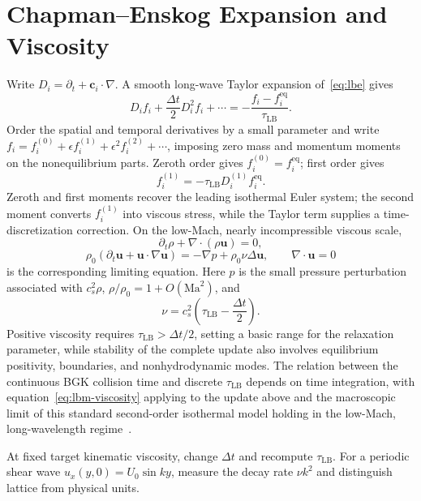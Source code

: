 \section{Chapman--Enskog Expansion and Viscosity}
Write $D_i=\partial_t+\bm c_i\cdot\nabla$.
A smooth long-wave Taylor expansion of~\eqref{eq:lbe} gives
\[
D_if_i+\frac{\Delta t}{2}D_i^2f_i+\cdots
=-\frac{f_i-f_i^{\mathrm{eq}}}{\tau_{\mathrm{LB}}}.
\]
Order the spatial and temporal derivatives by a small parameter and write
$f_i=f_i^{(0)}+\epsilon f_i^{(1)}+\epsilon^2f_i^{(2)}+\cdots$,
imposing zero mass and momentum moments on the nonequilibrium parts.
Zeroth order gives $f_i^{(0)}=f_i^{\mathrm{eq}}$; first order gives
\[
f_i^{(1)}=-\tau_{\mathrm{LB}}D_i^{(1)}f_i^{\mathrm{eq}}.
\]
Zeroth and first moments recover the leading isothermal Euler system;
the second moment converts $f_i^{(1)}$ into viscous stress, while the Taylor term supplies a time-discretization correction.
On the low-Mach, nearly incompressible viscous scale,
\[
\partial_t\rho+\nabla\cdot(\rho\bm u)=0,
\]
\[
\rho_0(\partial_t\bm u+\bm u\cdot\nabla\bm u)
=-\nabla p+\rho_0\nu\Delta\bm u,\qquad
\nabla\cdot\bm u=0
\]
is the corresponding limiting equation. Here $p$ is the small pressure perturbation associated with $c_s^2\rho$,
$\rho/\rho_0=1+O(\mathrm{Ma}^2)$, and
\begin{equation}\label{eq:lbm-viscosity}
\nu=c_s^2\left(\tau_{\mathrm{LB}}-\frac{\Delta t}{2}\right).
\end{equation}
Positive viscosity requires $\tau_{\mathrm{LB}}>\Delta t/2$, setting a basic range for the relaxation parameter, while stability of the complete update also involves equilibrium positivity, boundaries, and nonhydrodynamic modes. The relation between the continuous BGK collision time and discrete $\tau_{\mathrm{LB}}$ depends on time integration, with equation~\eqref{eq:lbm-viscosity} applying to the update above and the macroscopic limit of this standard second-order isothermal model holding in the low-Mach, long-wavelength regime~\cite{qian1992}.

{At fixed target kinematic viscosity, change $\Delta t$ and recompute $\tau_{\mathrm{LB}}$. For a periodic shear wave $u_x(y,0)=U_0\sin ky$, measure the decay rate $\nu k^2$ and distinguish lattice from physical units.}
